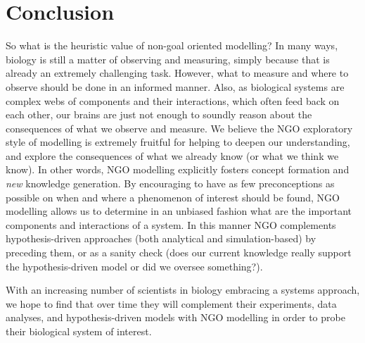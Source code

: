 \section{Conclusion}

So what is the heuristic value of non-goal oriented modelling? In many ways, biology is still a matter of observing and measuring, simply because that is already an extremely challenging task. However, what to measure and where to observe should be done in an informed manner. Also, as biological systems are complex webs of components and their interactions, which often feed back on each other, our brains are just not enough to soundly reason about the consequences of what we observe and measure. We believe the NGO exploratory style of modelling is extremely fruitful for helping to deepen our understanding, and explore the consequences of what we already know (or what we think we know). In other words, NGO modelling explicitly fosters concept formation and \emph{new} knowledge generation. By encouraging to have as few preconceptions as possible on when and where a phenomenon of interest should be found, NGO modelling allows us to determine in an unbiased fashion what are the important components and interactions of a system. In this manner NGO complements hypothesis-driven approaches (both analytical and simulation-based) by preceding them, or as a sanity check (does our current knowledge really support the hypothesis-driven model or did we oversee something?).

With an increasing number of scientists in biology embracing a systems approach, we hope to find that over time they will complement their experiments, data analyses, and hypothesis-driven models with NGO modelling in order to probe their biological system of interest.